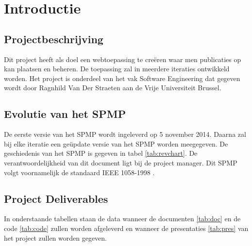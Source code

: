 \section{Introductie}



\subsection{Projectbeschrijving}

Dit project heeft als doel een webtoepassing te creëren waar men publicaties op kan plaatsen en beheren. De toepassing zal in meerdere iteraties ontwikkeld worden. Het project is onderdeel van het vak Software Engineering dat gegeven wordt door Ragnhild Van Der Straeten \cite{rvdstrae} aan de Vrije Universiteit Brussel. 
\begin{comment}
Het project heeft de naam WiseLib meegekregen omdat het een bibliotheek van wijsheid en kennis moet worden op het net.

WiseLib heeft als doel een webtoepassing te zijn waar onderzoekers publicaties op kunnen plaatsen en beheren. Met behulp van deze webtoepassing zullen de onderzoekers overal aan hun publicaties kunnen. Om het nog toegankelijker te maken zal er ook ondersteuning zijn voor de mobiele gebruiker.
\end{comment}

\subsection{Evolutie van het SPMP}
De eerste versie van het SPMP wordt ingeleverd op 5 november 2014. Daarna zal bij elke iteratie een geüpdate versie van het SPMP worden meegegeven. De geschiedenis van het SPMP is gegeven in tabel \ref{tab:revchart}. De verantwoordelijkheid van dit document ligt bij de project manager. Dit SPMP volgt voornamelijk de standaard IEEE 1058-1998 \cite{ieeestd}.

\subsection{Project Deliverables}

In onderstaande tabellen staan de data wanneer de documenten \ref{tab:doc} en de code \ref{tab:code} zullen worden afgeleverd en wanneer de presentaties \ref{tab:pres} van het project zullen worden gegeven. 

